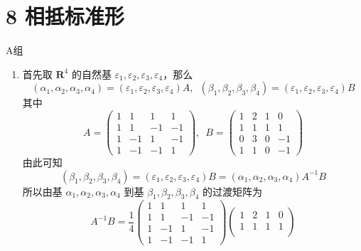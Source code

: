 \section*{8 相抵标准形}

\vspace{2ex}

\centerline{\heiti A组}
\begin{enumerate}
    \item 首先取 $ \mathbf{R}^4 $ 的自然基 $\varepsilon_1, \varepsilon_2, \varepsilon_3, \varepsilon_4$，那么
          \[ (\alpha_1, \alpha_2, \alpha_3, \alpha_4) = (\varepsilon_1, \varepsilon_2, \varepsilon_3, \varepsilon_4) A,\enspace (\beta_1, \beta_2, \beta_3, \beta_4) = (\varepsilon_1, \varepsilon_2, \varepsilon_3, \varepsilon_4) B \]
          其中
          \[ A = \begin{pmatrix}
                  1 & 1  & 1  & 1  \\
                  1 & 1  & -1 & -1 \\
                  1 & -1 & 1  & -1 \\
                  1 & -1 & -1 & 1
              \end{pmatrix},\enspace B = \begin{pmatrix}
                  1 & 2 & 1 & 0  \\
                  1 & 1 & 1 & 1  \\
                  0 & 3 & 0 & -1 \\
                  1 & 1 & 0 & -1
              \end{pmatrix} \]
          由此可知
          \[ (\beta_1, \beta_2, \beta_3, \beta_4) = (\varepsilon_1, \varepsilon_2, \varepsilon_3, \varepsilon_4) B = (\alpha_1, \alpha_2, \alpha_3, \alpha_4) A^{-1} B \]
          所以由基 $ \alpha_1, \alpha_2, \alpha_3, \alpha_4 $ 到基 $ \beta_1, \beta_2, \beta_3, \beta_4 $ 的过渡矩阵为
          \[ A^{-1} B = \frac{1}{4} \begin{pmatrix}
                  1 & 1  & 1  & 1  \\
                  1 & 1  & -1 & -1 \\
                  1 & -1 & 1  & -1 \\
                  1 & -1 & -1 & 1
              \end{pmatrix} \begin{pmatrix}
                  1 & 2 & 1 & 0  \\
                  1 & 1 & 1 & 1  \\

\end{pmatrix}\]
\end{enumerate}
